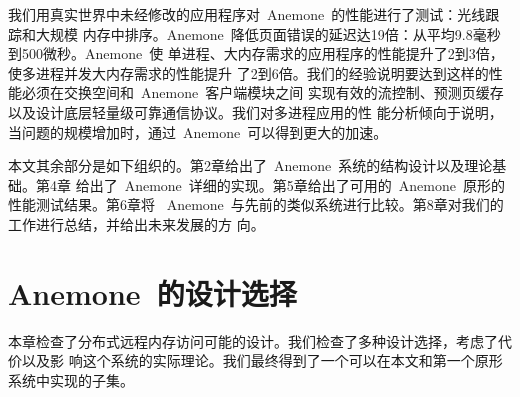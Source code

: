 \documentclass[dvipdfm, NoBUAAtitle]{BUAApaper}
\begin{document}
我们用真实世界中未经修改的应用程序对~Anemone~的性能进行了测试：光线跟踪和大规模
内存中排序。Anemone~降低页面错误的延迟达19倍：从平均9.8毫秒到500微秒。Anemone~使
单进程、大内存需求的应用程序的性能提升了2到3倍，使多进程并发大内存需求的性能提升
了2到6倍。我们的经验说明要达到这样的性能必须在交换空间和~Anemone~客户端模块之间
实现有效的流控制、预测页缓存以及设计底层轻量级可靠通信协议。我们对多进程应用的性
能分析倾向于说明，当问题的规模增加时，通过~Anemone~可以得到更大的加速。

本文其余部分是如下组织的。第2章给出了~Anemone~系统的结构设计以及理论基础。第4章
给出了~Anemone~详细的实现。第5章给出了可用的~Anemone~原形的性能测试结果。第6章将
~Anemone~与先前的类似系统进行比较。第8章对我们的工作进行总结，并给出未来发展的方
向。

\section{Anemone~的设计选择}

本章检查了分布式远程内存访问可能的设计。我们检查了多种设计选择，考虑了代价以及影
响这个系统的实际理论。我们最终得到了一个可以在本文和第一个原形系统中实现的子集。
\end{document}
